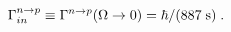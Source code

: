 \begin{equation}
\Gamma^{n\to p}_{in} \equiv
\Gamma^{n\to p}(\Omega\to 0) 
= \hbar / (887 \; {\rm s} )\;.
\label{GEFF}
\end{equation}

